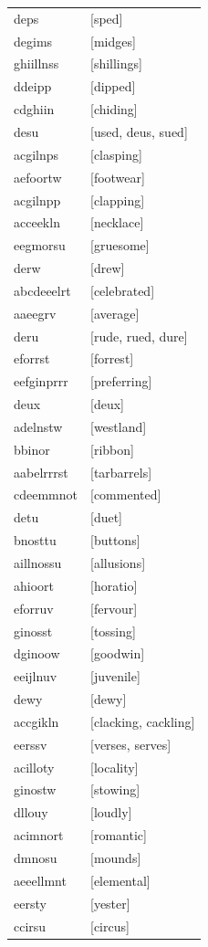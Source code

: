 \documentclass{article}
\begin{document}
\begin{tabular}{ll}
deps & [sped] \\
degims & [midges] \\
ghiillnss & [shillings] \\
ddeipp & [dipped] \\
cdghiin & [chiding] \\
desu & [used, deus, sued] \\
acgilnps & [clasping] \\
aefoortw & [footwear] \\
acgilnpp & [clapping] \\
acceekln & [necklace] \\
eegmorsu & [gruesome] \\
derw & [drew] \\
abcdeeelrt & [celebrated] \\
aaeegrv & [average] \\
deru & [rude, rued, dure] \\
eforrst & [forrest] \\
eefginprrr & [preferring] \\
deux & [deux] \\
adelnstw & [westland] \\
bbinor & [ribbon] \\
aabelrrrst & [tarbarrels] \\
cdeemmnot & [commented] \\
detu & [duet] \\
bnosttu & [buttons] \\
aillnossu & [allusions] \\
ahioort & [horatio] \\
eforruv & [fervour] \\
ginosst & [tossing] \\
dginoow & [goodwin] \\
eeijlnuv & [juvenile] \\
dewy & [dewy] \\
accgikln & [clacking, cackling] \\
eerssv & [verses, serves] \\
acilloty & [locality] \\
ginostw & [stowing] \\
dllouy & [loudly] \\
acimnort & [romantic] \\
dmnosu & [mounds] \\
aeeellmnt & [elemental] \\
eersty & [yester] \\
ccirsu & [circus] \\

\end{tabular}
\end{document}
